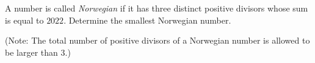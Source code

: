 A number is called \emph{Norwegian} if it has three distinct positive divisors whose sum is equal to $2022$. Determine the smallest Norwegian number.

(Note: The total number of positive divisors of a Norwegian number is allowed to be larger than $3$.)
